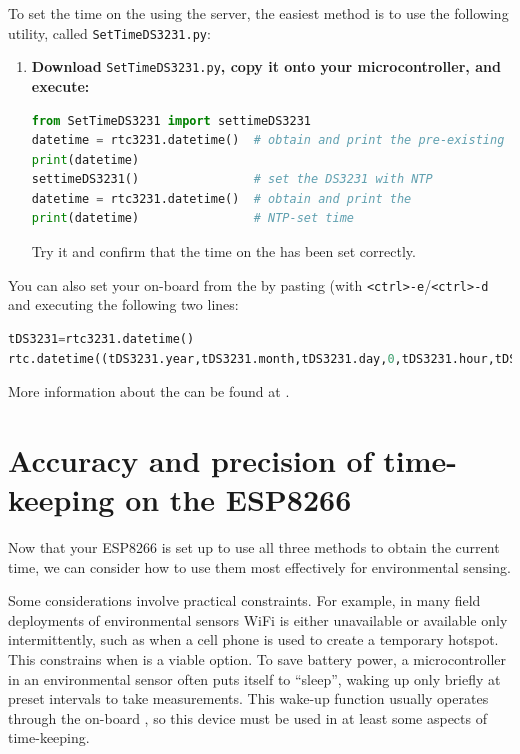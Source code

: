 To set the time on the  using the \ntp server, the easiest method is to use the following utility, called \texttt{SetTimeDS3231.py}:

%
\begin{enumerate}[resume]
	\item \textbf{Download} \lstinline{SetTimeDS3231.py}\textbf{, copy it onto your microcontroller, and execute:} 
\begin{lstlisting}[language=Python]
from SetTimeDS3231 import settimeDS3231
datetime = rtc3231.datetime()  # obtain and print the pre-existing time
print(datetime)                
settimeDS3231()                # set the DS3231 with NTP
datetime = rtc3231.datetime()  # obtain and print the
print(datetime)                # NTP-set time
\end{lstlisting}
	Try it and confirm that the time on the  \rtc has been set correctly. 	
\end{enumerate}

You can also set your on-board \rtc from the  by pasting (with \texttt{<ctrl>-e}/\texttt{<ctrl>-d} and executing the following two lines:
\begin{lstlisting}[language=Python]
tDS3231=rtc3231.datetime()
rtc.datetime((tDS3231.year,tDS3231.month,tDS3231.day,0,tDS3231.hour,tDS3231.minute,tDS3231.second,0))
\end{lstlisting}

More information about the  \rtc can be found at .



\section{Accuracy and precision of time-keeping on the ESP8266}
Now that your ESP8266 is set up to use all three methods to obtain the current time, we can consider how to use them most effectively for environmental sensing. 

Some considerations involve practical constraints. 
For example, in many field deployments of environmental sensors WiFi is either unavailable or available only intermittently, such as when a cell phone is used to create a temporary hotspot.
This constrains when \ntp is a viable option.
To save battery power, a microcontroller in an environmental sensor often puts itself to ``sleep'', waking up only briefly at preset intervals to take measurements.  
This wake-up function usually operates through the on-board \rtc, so this device must be used in at least some aspects of time-keeping. 

